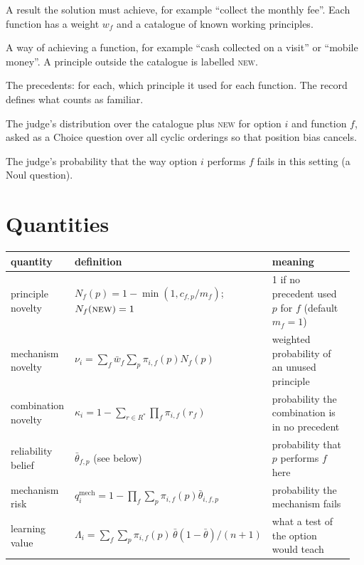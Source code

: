 \documentclass[11pt]{article}
\begin{document}
\begin{description}[leftmargin=0pt]
\item[Function.] A result the solution must achieve, for example ``collect the monthly fee''. Each
function has a weight $w_f$ and a catalogue of known working principles.
\item[Working principle.] A way of achieving a function, for example ``cash collected on a visit''
or ``mobile money''. A principle outside the catalogue is labelled \textsc{new}.
\item[Record.] The precedents: for each, which principle it used for each function. The record
defines what counts as familiar.
\item[Classification $\pi_{i,f}$.] The judge's distribution over the catalogue plus \textsc{new}
for option $i$ and function $f$, asked as a Choice question over all cyclic orderings so that
position bias cancels.
\item[Risk estimate $r_{i,f}$.] The judge's probability that the way option $i$ performs $f$ fails
in this setting (a Noul question).
\end{description}

\section{Quantities}

\begin{table}[h]
\centering\small
\setlength{\tabcolsep}{4pt}
\begin{tabular}{@{}p{0.19\linewidth}p{0.42\linewidth}p{0.35\linewidth}@{}}
\toprule
quantity & definition & meaning \\
\midrule
principle novelty & $N_f(p)=1-\min(1,c_{f,p}/m_f)$; $N_f(\textsc{new})=1$ & 1 if no precedent used $p$ for $f$ (default $m_f=1$) \\
mechanism novelty & $\nu_i=\sum_f\bar w_f\sum_p\pi_{i,f}(p)N_f(p)$ & weighted probability of an unused principle \\
combination novelty & $\kappa_i=1-\sum_{r\in R^\ast}\prod_f\pi_{i,f}(r_f)$ & probability the combination is in no precedent \\
reliability belief & $\bar\theta_{f,p}$ (see below) & probability that $p$ performs $f$ here \\
mechanism risk & $q_i^{\mathrm{mech}}=1-\prod_f\sum_p\pi_{i,f}(p)\bar\theta_{i,f,p}$ & probability the mechanism fails \\
learning value & $\Lambda_i=\sum_f\sum_p\pi_{i,f}(p)\,\bar\theta(1-\bar\theta)/(n+1)$ & what a test of the option would teach \\
\bottomrule
\end{tabular}
\end{table}
\end{document}
